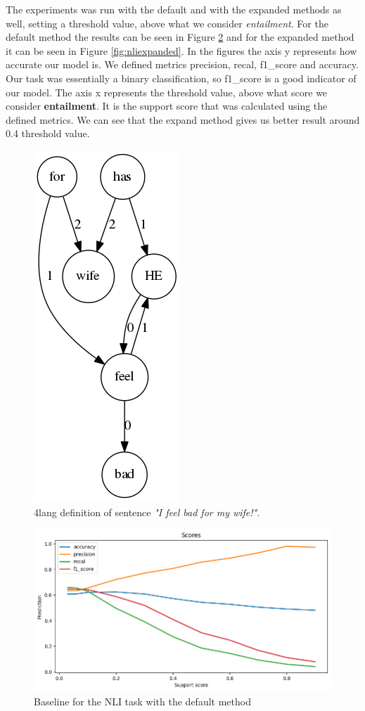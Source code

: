 The experiments was run with the default and with the expanded methods as well, setting a threshold value, above what we consider \textit{entailment}. For the default method the results can be seen in Figure \ref{fig:nlidefault} and for the expanded method it can be seen in Figure \ref{fig:nliexpanded}. In the figures the axis y represents how accurate our model is. We defined metrics precision, recal, f1\_score and accuracy. Our task was essentially a binary classification, so f1\_score is a good indicator of our model. The axis x represents the threshold value, above what score we consider \textbf{entailment}. It is the support score that was calculated using the defined metrics. We can see that the expand method gives us better result around 0.4 threshold value.

\begin{figure}
	\centering
	\includegraphics[scale=0.5]{figures/ifeelbad}
	\caption{4lang definition of sentence \textit{"I feel bad for my wife!"}.}
	\label{fig:ifeelbad}
\end{figure}

\begin{figure}
	\centering
	\includegraphics[scale=0.5]{figures/nlidefault}
	\caption{Baseline for the NLI task with the default method}
	\label{fig:nlidefault}
\end{figure}

